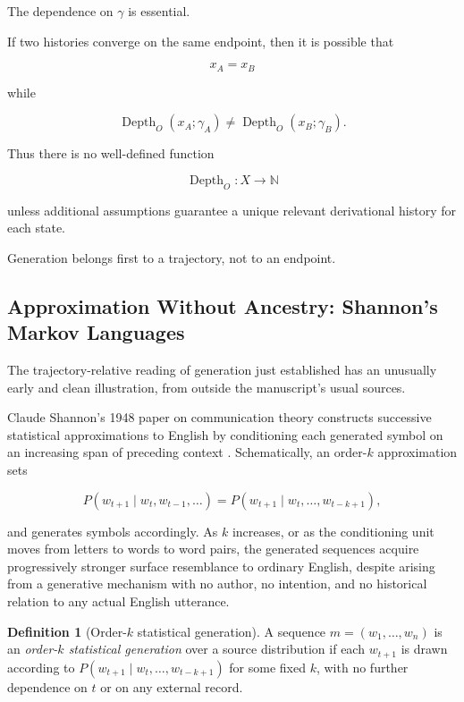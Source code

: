 \documentclass[
  11pt,
  a4paper,
  DIV=12,
  BCOR=0mm,
  parskip=half-
]{scrartcl}
\newcommand{\Depth}{\operatorname{Depth}}
\theoremstyle{definition}
\newtheorem{definition}{Definition}[section]
\theoremstyle{plain}
\theoremstyle{remark}
\begin{document}
The dependence on \(\gamma\) is essential.

If two histories converge on the same endpoint, then it is possible that

\[
  x_A=x_B
\]

while

\[
  \Depth_O(x_A;\gamma_A)
  \neq
  \Depth_O(x_B;\gamma_B).
\]

Thus there is no well-defined function

\[
  \Depth_O:X\longrightarrow\mathbb N
\]

unless additional assumptions guarantee a unique relevant derivational
history for each state.

Generation belongs first to a trajectory, not to an endpoint.


\subsection{Approximation Without Ancestry: Shannon's Markov Languages}
\label{sec:shannon-markov}

The trajectory-relative reading of generation just established has an
unusually early and clean illustration, from outside the manuscript's usual
sources.

Claude Shannon's 1948 paper on communication theory constructs successive
statistical approximations to English by conditioning each generated symbol
on an increasing span of preceding context \cite{shannon1948}. Schematically,
an order-\(k\) approximation sets

\[
  P(w_{t+1}\mid w_t,w_{t-1},\ldots)
  =
  P(w_{t+1}\mid w_t,\ldots,w_{t-k+1}),
\]

and generates symbols accordingly. As \(k\) increases, or as the conditioning
unit moves from letters to words to word pairs, the generated sequences
acquire progressively stronger surface resemblance to ordinary English,
despite arising from a generative mechanism with no author, no intention, and
no historical relation to any actual English utterance.

\begin{definition}[Order-\(k\) statistical generation]
\label{def:order-k-generation}
A sequence \(m=(w_1,\ldots,w_n)\) is an \emph{order-\(k\) statistical
generation} over a source distribution if each \(w_{t+1}\) is drawn according
to \(P(w_{t+1}\mid w_t,\ldots,w_{t-k+1})\) for some fixed \(k\), with no
further dependence on \(t\) or on any external record.
\end{definition}
\end{document}
